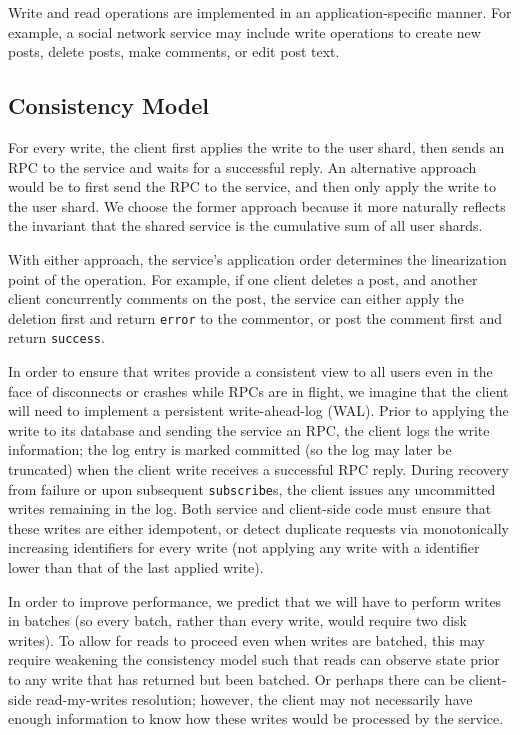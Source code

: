 \documentclass[letterpaper,twocolumn,10pt]{article}
\begin{document}
Write and read operations are implemented in an application-specific manner.
For example, a social network service may include write operations to create new posts,
delete posts, make comments, or edit post text.

\subsection{Consistency Model}
\label{sec:logging}
For every write, the client first applies the write to the user shard, then 
sends an RPC to the service and waits for a successful reply.
An alternative approach would be to first send the RPC to the service, and then only apply the write to the user shard. 
We choose the former approach because it more naturally reflects the invariant that the shared service is the 
cumulative sum of all user shards.

With either approach, the service's application order determines the linearization point of the operation.
For example, if one client deletes a post, and another client concurrently comments on the post,
the service can either apply the deletion first and return \texttt{error} to the commentor, or post the comment first
and return \texttt{success}.

In order to ensure that writes provide a consistent view to all users even in the face of disconnects or crashes 
while RPCs are in flight, we imagine that the client will need to implement a persistent write-ahead-log (WAL). 
Prior to applying the write to its database and sending the service an RPC, the client logs the write information; 
the log entry is marked committed (so the log may later be truncated) when the client write receives a successful RPC reply. 
During recovery from failure or upon subsequent \texttt{subscribe}s, the client issues any uncommitted writes remaining in the log. Both service and client-side code must ensure that these writes are either idempotent, or detect duplicate requests via 
monotonically increasing identifiers for every write (not applying any write with a identifier lower than that of the last applied write).

In order to improve performance, we predict that we will have to perform writes in batches (so every batch, rather than every write, would require two disk writes). To allow for reads to proceed even when writes are batched, 
this may require weakening the consistency model such that reads can observe state prior to any write that has returned but been batched. Or perhaps there can be client-side read-my-writes resolution; however, the client may not necessarily have enough information to know how these writes would be processed by the service.
\end{document}
